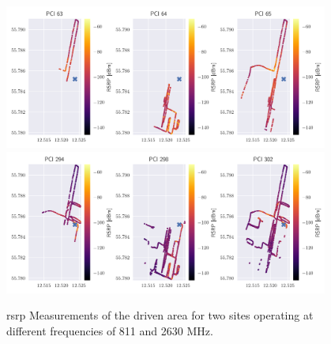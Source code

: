 \begin{figure}
    \centering
    \includegraphics[width=0.95\textwidth]{appendix/figures/pci_63_64_65_scatter.png}
    \includegraphics[width=0.95\textwidth]{appendix/figures/pci_294_298_302_scatter.png}
    \caption{\gls{rsrp} Measurements of the driven area for two sites operating at different frequencies of 811 and 2630 MHz.}
    \label{fig:drive_test_2020_scatter}
\end{figure}
